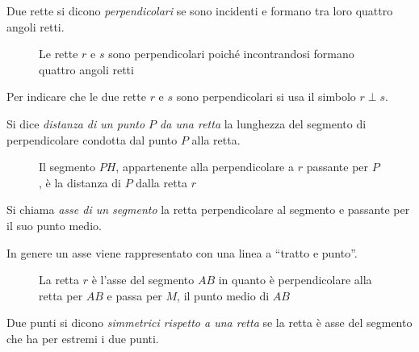 \begin{definizione}
Due rette si dicono \emph{perpendicolari} se sono incidenti e formano 
tra loro quattro angoli retti.
\end{definizione}


\begin{inaccessibleblock}
 \begin{figure}[htb]
\centering
\caption{Le rette $r$ e $s$ sono perpendicolari poiché incontrandosi 
formano quattro angoli retti}
\end{figure}
\end{inaccessibleblock}

Per indicare che le due rette $r$ e $s$ sono perpendicolari si usa il 
simbolo $r\perp s$.

\begin{definizione}
Si dice \emph{distanza di un punto $P$ da una retta} la lunghezza del 
segmento di perpendicolare condotta dal punto $P$ alla retta.
\end{definizione}


\begin{inaccessibleblock}
 \begin{figure}[htb]
\centering
\caption{Il segmento $PH$, appartenente alla perpendicolare a $r$ 
passante per $P$, è la distanza di $P$ dalla retta $r$}
\end{figure}
\end{inaccessibleblock}

\begin{definizione}\label{def:asse_segmento}
Si chiama \emph{asse di un segmento} la retta perpendicolare al 
segmento e passante per il suo punto medio.
\end{definizione}

In genere un asse viene rappresentato con una linea a ``tratto e 
punto''.


\begin{inaccessibleblock}
 \begin{figure}[htb]
\centering
\caption{La retta $r$ è l'asse del segmento $AB$ in quanto è 
perpendicolare alla retta per $AB$ e passa per $M$, il punto medio di 
$AB$}\label{fig:1.38}
\end{figure}
\end{inaccessibleblock}

\begin{definizione}
Due punti si dicono \emph{simmetrici rispetto a una retta} se la 
retta è asse del segmento che ha per estremi i due punti.
\end{definizione}

